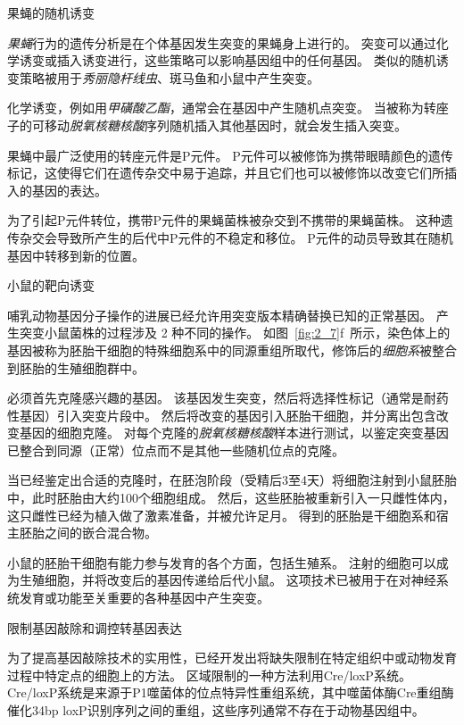 \begin{proposition}[在实验动物中产生突变] \label{box:2_2}
	
	\quad \quad \textcolor[HTML]{00A652}{果蝇的随机诱变}
	
	\quad \quad \textit{果蝇}行为的遗传分析是在个体基因发生突变的果蝇身上进行的。
	突变可以通过化学诱变或插入诱变进行，这些策略可以影响基因组中的任何基因。
	类似的随机诱变策略被用于\textit{秀丽隐杆线虫}、斑马鱼和小鼠中产生突变。
	
	\quad \quad 化学诱变，例如用\textit{甲磺酸乙酯}，通常会在基因中产生随机点突变。
	当被称为转座子的可移动\textit{脱氧核糖核酸}序列随机插入其他基因时，就会发生插入突变。
	
	\quad \quad 果蝇中最广泛使用的转座元件是P元件。
	P元件可以被修饰为携带眼睛颜色的遗传标记，这使得它们在遗传杂交中易于追踪，并且它们也可以被修饰以改变它们所插入的基因的表达。
	
	\quad \quad 为了引起P元件转位，携带P元件的果蝇菌株被杂交到不携带的果蝇菌株。
	这种遗传杂交会导致所产生的后代中P元件的不稳定和移位。
	P元件的动员导致其在随机基因中转移到新的位置。
	
	\quad \quad \textcolor[HTML]{00A652}{小鼠的靶向诱变}
	
	\quad \quad 哺乳动物基因分子操作的进展已经允许用突变版本精确替换已知的正常基因。
	产生突变小鼠菌株的过程涉及 2 种不同的操作。
	如图~\ref{fig:2_7}f~所示，染色体上的基因被称为胚胎干细胞的特殊细胞系中的同源重组所取代，修饰后的\textit{细胞系}被整合到胚胎的生殖细胞群中。
	
	\quad \quad 必须首先克隆感兴趣的基因。
	该基因发生突变，然后将选择性标记（通常是耐药性基因）引入突变片段中。
	然后将改变的基因引入胚胎干细胞，并分离出包含改变基因的细胞克隆。
	对每个克隆的\textit{脱氧核糖核酸}样本进行测试，以鉴定突变基因已整合到同源（正常）位点而不是其他一些随机位点的克隆。
	
	\quad \quad 当已经鉴定出合适的克隆时，在胚泡阶段（受精后3至4天）将细胞注射到小鼠胚胎中，此时胚胎由大约100个细胞组成。
	然后，这些胚胎被重新引入一只雌性体内，这只雌性已经为植入做了激素准备，并被允许足月。
	得到的胚胎是干细胞系和宿主胚胎之间的嵌合混合物。
	
	\quad \quad 小鼠的胚胎干细胞有能力参与发育的各个方面，包括生殖系。
	注射的细胞可以成为生殖细胞，并将改变后的基因传递给后代小鼠。
	这项技术已被用于在对神经系统发育或功能至关重要的各种基因中产生突变。
	
	\quad \quad \textcolor[HTML]{00A652}{限制基因敲除和调控转基因表达}
	
	\quad \quad 为了提高基因敲除技术的实用性，已经开发出将缺失限制在特定组织中或动物发育过程中特定点的细胞上的方法。
	区域限制的一种方法利用Cre/loxP系统。
	Cre/loxP系统是来源于P1噬菌体的位点特异性重组系统，其中噬菌体酶Cre重组酶催化34bp loxP识别序列之间的重组，这些序列通常不存在于动物基因组中。
	

\end{proposition}

